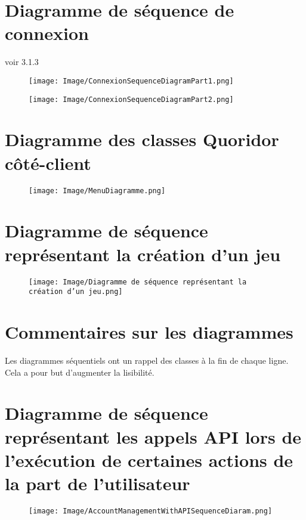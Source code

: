 \documentclass[french, utf8]{article}
\begin{document}
\section{Diagramme de séquence de connexion}
\label{sec:ConnectionSequence}
voir 3.1.3 

\begin{figure}[ht]
     \centering
    \texttt{[image: Image/ConnexionSequenceDiagramPart1.png]}
\end{figure}
\newpage
\begin{figure}[ht]
     \centering
    \texttt{[image: Image/ConnexionSequenceDiagramPart2.png]}
\end{figure}
\newpage

\section{Diagramme des classes Quoridor côté-client}
\begin{figure}[ht]
\centering
    \texttt{[image: Image/MenuDiagramme.png]}
\end{figure}
\newpage

\section{Diagramme de séquence représentant la création d'un jeu}
\begin{figure}[ht]
\centering
    \texttt{[image: Image/Diagramme de séquence représentant la création d'un jeu.png]}
\end{figure}

\section{Commentaires sur les diagrammes}
Les diagrammes séquentiels ont un rappel des classes à la fin de chaque ligne. Cela a pour but d'augmenter la lisibilité.

\section{Diagramme de séquence représentant les appels API lors de l'exécution de certaines actions de la part de l'utilisateur}
\begin{figure}[ht]
\centering
    \texttt{[image: Image/AccountManagementWithAPISequenceDiaram.png]}
\end{figure}
\newpage
\end{document}
